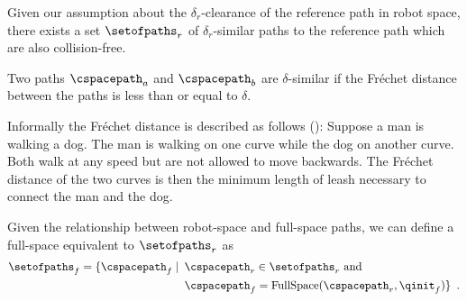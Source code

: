 Given our assumption about the $\delta_r$-clearance of the reference path in robot space, there exists a set $\setofpaths_r$ of $\delta_r$-similar paths to the reference path which are also collision-free.


\begin{definition}
    Two paths $\cspacepath_a$ and $\cspacepath_b$ are $\delta$-similar if the Fr\'echet distance between the paths is less than or equal to $\delta$.
\end{definition}

Informally the Fr\'echet distance is described as follows (\cite{Alt1995Frechet}): Suppose a man is walking a dog. The man is walking on one curve while the dog on another curve. Both walk at any speed but are not allowed to move backwards. The Fr\'echet distance of the two curves is then the minimum length of leash necessary to connect the man and the dog.


Given the relationship between robot-space and full-space paths, we can define a full-space equivalent to $\setofpaths_r$ as
\begin{equation}
\begin{split}
    \setofpaths_f = \{ \cspacepath_f \mid \enspace &\cspacepath_r \in \setofpaths_r \textrm{ and} \\
                                                   &\cspacepath_f = \textrm{FullSpace}(\cspacepath_r, \qinit_f) \} \enspace .
\end{split}
\end{equation}





